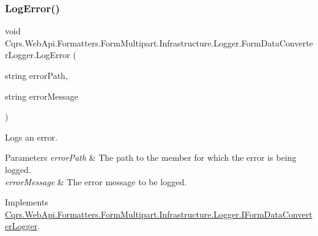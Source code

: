 \mbox{\label{classCqrs_1_1WebApi_1_1Formatters_1_1FormMultipart_1_1Infrastructure_1_1Logger_1_1FormDataConverterLogger_a72fcac7560a05dfebbff772a4216a5d8_a72fcac7560a05dfebbff772a4216a5d8}} 
\subsubsection{\texorpdfstring{Log\+Error()}{LogError()}\hspace{0.1cm}{\footnotesize\ttfamily [2/2]}}
{\footnotesize\ttfamily void Cqrs.\+Web\+Api.\+Formatters.\+Form\+Multipart.\+Infrastructure.\+Logger.\+Form\+Data\+Converter\+Logger.\+Log\+Error (\begin{DoxyParamCaption}\item[{string}]{error\+Path,  }\item[{string}]{error\+Message }\end{DoxyParamCaption})}



Logs an error. 


\begin{DoxyParams}{Parameters}
{\em error\+Path} & The path to the member for which the error is being logged.\\
\hline
{\em error\+Message} & The error message to be logged.\\
\hline
\end{DoxyParams}


Implements \hyperlink{interfaceCqrs_1_1WebApi_1_1Formatters_1_1FormMultipart_1_1Infrastructure_1_1Logger_1_1IFormDataConverterLogger_a0067054a5f882d2687e8fd9f9ae38e9b_a0067054a5f882d2687e8fd9f9ae38e9b}{Cqrs.\+Web\+Api.\+Formatters.\+Form\+Multipart.\+Infrastructure.\+Logger.\+I\+Form\+Data\+Converter\+Logger}.

